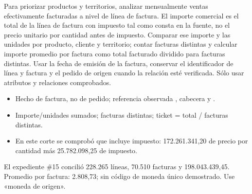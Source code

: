 \label{wwi01}
\begin{goal}
Para priorizar productos y territorios, analizar mensualmente ventas efectivamente facturadas a nivel de línea de factura. El importe comercial es el total de la línea de factura con impuesto tal como consta en la fuente, no el precio unitario por cantidad antes de impuesto. Comparar ese importe y las unidades por producto, cliente y territorio; contar facturas distintas y calcular importe promedio por factura como total facturado dividido para facturas distintas. Usar la fecha de emisión de la factura, conservar el identificador de línea y factura y el pedido de origen cuando la relación esté verificada. Sólo usar atributos y relaciones comprobados.
\end{goal}
\begin{itemize}
\item Hecho de factura, no de pedido; referencia observada , cabecera  y .
\item Importe/unidades sumados; facturas distintas; ticket = total / facturas distintas.
\item En este corte se comprobó que  incluye impuesto: 172.261.341,20 de precio por cantidad más 25.782.098,25 de impuesto.
\end{itemize}
\begin{good}
El expediente \#15 concilió 228.265 líneas, 70.510 facturas y 198.043.439,45. Promedio por factura: 2.808,73; sin código de moneda único demostrado. Use «moneda de origen».
\end{good}

